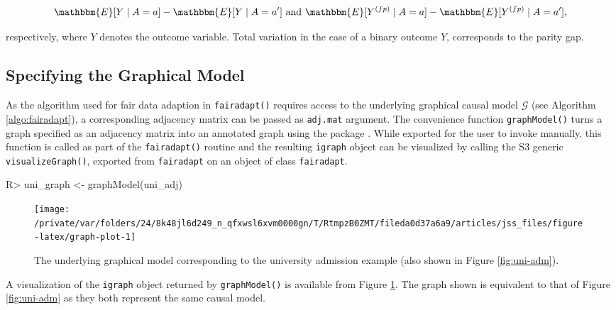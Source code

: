 \documentclass[
  nojss]{jss}
\begin{document}
\[\mathbbm{E}[Y \mid A = a] - \mathbbm{E}[Y \mid A = a'] \text{ and } \mathbbm{E}[ {Y}^{(fp)} \mid A = a] - \mathbbm{E}[ {Y}^{(fp)} \mid A = a'],\]

respectively, where \(Y\) denotes the outcome variable. Total variation
in the case of a binary outcome \(Y\), corresponds to the parity gap.

\hypertarget{specifying-the-graphical-model}{%
\subsection{Specifying the Graphical
Model}\label{specifying-the-graphical-model}}

As the algorithm used for fair data adaption in \texttt{fairadapt()}
requires access to the underlying graphical causal model \(\mathcal{G}\)
(see Algorithm \ref{algo:fairadapt}), a corresponding adjacency matrix
can be passed as \texttt{adj.mat} argument. The convenience function
\texttt{graphModel()} turns a graph specified as an adjacency matrix
into an annotated graph using the  package
\citep{csardi2006igraph}. While exported for the user to invoke
manually, this function is called as part of the \texttt{fairadapt()}
routine and the resulting \texttt{igraph} object can be visualized by
calling the S3 generic \texttt{visualizeGraph()}, exported from
\texttt{fairadapt} on an object of class \texttt{fairadapt}.

\begin{CodeChunk}
\begin{CodeInput}
R> uni_graph <- graphModel(uni_adj)
\end{CodeInput}
\end{CodeChunk}

\begin{CodeChunk}
\begin{figure}

{\centering \texttt{[image: /private/var/folders/24/8k48jl6d249\_n\_qfxwsl6xvm0000gn/T/RtmpzB0ZMT/fileda0d37a6a9/articles/jss\_files/figure-latex/graph-plot-1]} 

}

\caption{The underlying graphical model corresponding to the university admission example (also shown in Figure \ref{fig:uni-adm}).}\label{fig:graph-plot}
\end{figure}
\end{CodeChunk}

A visualization of the \texttt{igraph} object returned by
\texttt{graphModel()} is available from Figure \ref{fig:graph-plot}. The
graph shown is equivalent to that of Figure \ref{fig:uni-adm} as they
both represent the same causal model.
\end{document}
